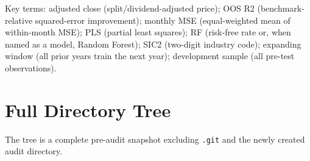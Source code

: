 \documentclass[
  11pt,
  a4paper]{article}
\begin{document}
Key terms: adjusted close (split/dividend-adjusted price); OOS R2
(benchmark-relative squared-error improvement); monthly MSE
(equal-weighted mean of within-month MSE); PLS (partial least squares);
RF (risk-free rate or, when named as a model, Random Forest); SIC2
(two-digit industry code); expanding window (all prior years train the
next year); development sample (all pre-test observations).

\appendix

\section{Full Directory Tree}\label{app-tree}

The tree is a complete pre-audit snapshot excluding \texttt{.git} and
the newly created audit directory.
\end{document}
